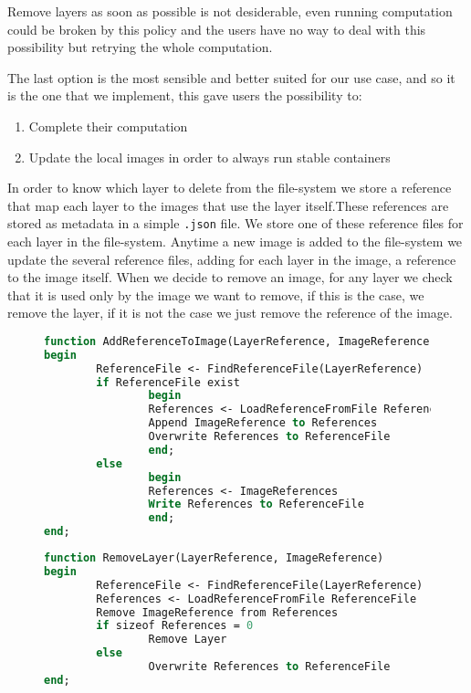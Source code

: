 Remove layers as soon as possible is not desiderable, even running computation
could be broken by this policy and the users have no way to deal with this
possibility but retrying the whole computation.

The last option is the most sensible and better suited for our use case, and so
it is the one that we implement, this gave users the possibility to:
\begin{enumerate}
\item Complete their computation
\item Update the local images in order to always run stable containers
\end{enumerate}

In order to know which layer to delete from the file-system we store a
reference that map each layer to the images that use the layer itself.These
references are stored as metadata in a simple \texttt{.json} file.  We store
one of these reference files for each layer in the file-system.  Anytime a new
image is added to the file-system we update the several reference files,
adding for each layer in the image, a reference to the image itself.  When we
decide to remove an image, for any layer we check that it is used only by the
image we want to remove, if this is the case, we remove the layer, if it is not
the case we just remove the reference of the image.

\begin{figure}
\begin{lstlisting}[language=Pascal,caption={Algorithm to add an image reference to the layer metadata}, label={lst:add-image-reference-to-layer}]
function AddReferenceToImage(LayerReference, ImageReference)
begin 
        ReferenceFile <- FindReferenceFile(LayerReference)
        if ReferenceFile exist
                begin
                References <- LoadReferenceFromFile ReferenceFile
                Append ImageReference to References
                Overwrite References to ReferenceFile
                end;
        else 
                begin
                References <- ImageReferences
                Write References to ReferenceFile
                end;
end;
\end{lstlisting}
\end{figure}

\begin{figure}
\begin{lstlisting}[language=Pascal,caption={Algorithm to remove an image from the file-system}, label={lst:remove-layer}]
function RemoveLayer(LayerReference, ImageReference)
begin
        ReferenceFile <- FindReferenceFile(LayerReference)
        References <- LoadReferenceFromFile ReferenceFile
        Remove ImageReference from References
        if sizeof References = 0
                Remove Layer
        else
                Overwrite References to ReferenceFile
end;
\end{lstlisting}
\end{figure}

